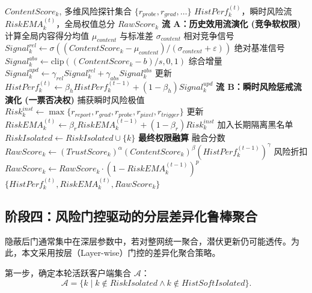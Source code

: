\documentclass[11pt, a4paper, UTF8, fontset=fandol]{ctexart}
\begin{document}
\begin{algorithm}[htbp]
\caption{双流正交信任状态演化 (HistPerf \& RiskEMA)}
\label{alg:phase3}
\begin{algorithmic}[1]
\REQUIRE $ContentScore_k$, 多维风险探针集合 $\{r_{probe}, r_{grad}, \dots\}$
\ENSURE $HistPerf_k^{(t)}$，瞬时风险流 $RiskEMA_k^{(t)}$，全局权值总分 $RawScore_k$
\STATE \textbf{流 A：历史效用流演化 (竞争软权限)}
\STATE 计算全局内容得分均值 $\mu_{content}$ 与标准差 $\sigma_{content}$
    \STATE 相对竞争信号 $Signal_k^{rel} \leftarrow \sigma((ContentScore_k - \mu_{content})/(\sigma_{content} + \varepsilon))$
    \STATE 绝对基准信号 $Signal_k^{abs} \leftarrow \mathrm{clip}((ContentScore_k - b)/s, 0, 1)$
    \STATE 综合增量 $Signal_k^{upd} \leftarrow \gamma_{rel} Signal_k^{rel} + \gamma_{abs} Signal_k^{abs}$
    \STATE 更新 $HistPerf_k^{(t)} \leftarrow \beta_h HistPerf_k^{(t-1)} + (1 - \beta_h) Signal_k^{upd}$
\ENDFOR
\STATE \textbf{流 B：瞬时风险惩戒流演化 (一票否决权)}
    \STATE 捕获瞬时风险极值 $Risk_k^{inst} \leftarrow \max\{r_{report}, r_{grad}, r_{probe}, r_{pixel}, r_{trigger}\}$
    \STATE 更新 $RiskEMA_k^{(t)} \leftarrow \beta_r RiskEMA_k^{(t-1)} + (1-\beta_r) Risk_k^{inst}$
        \STATE 加入长期隔离黑名单 $RiskIsolated \leftarrow RiskIsolated \cup \{k\}$
    \ENDIF
\ENDFOR
\STATE \textbf{最终权限融算}
    \STATE 融合分数 $RawScore_k \leftarrow (TrustScore_k)^\alpha (ContentScore_k)^\beta (HistPerf_k^{(t-1)})^\gamma$
    \STATE 风险折扣 $RawScore_k \leftarrow RawScore_k \cdot (1 - RiskEMA_k^{(t-1)})^p$
\ENDFOR
\RETURN $\{HistPerf_k^{(t)}, RiskEMA_k^{(t)}, RawScore_k\}$
\end{algorithmic}
\end{algorithm}


\subsection{阶段四：风险门控驱动的分层差异化鲁棒聚合}
隐蔽后门通常集中在深层参数中，若对整网统一聚合，潜伏更新仍可能透传。为此，本文采用按层（Layer-wise）门控的差异化聚合策略。

第一步，确定本轮活跃客户端集合 $\mathcal{A}$：
\begin{equation} \label{eq:active_clients}
    \mathcal{A} = \{k \mid k \notin RiskIsolated \land k \notin HistSoftIsolated\}.
\end{equation}
\end{document}
